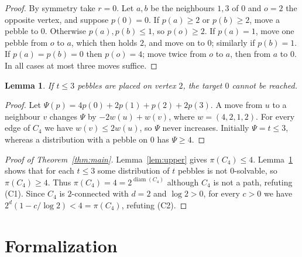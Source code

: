 \documentclass[11pt]{article}
\theoremstyle{plain}
\newtheorem{lemma}[theorem]{Lemma}
\theoremstyle{definition}
\theoremstyle{remark}
\newcommand{\diam}{\operatorname{diam}}
\begin{document}
\begin{proof}
By symmetry take $r=0$. Let $a,b$ be the neighbours $1,3$ of $0$ and $o=2$ the
opposite vertex, and suppose $p(0)=0$. If $p(a)\ge2$ or $p(b)\ge2$, move a pebble to
$0$. Otherwise $p(a),p(b)\le1$, so $p(o)\ge2$. If $p(a)=1$, move one pebble from $o$
to $a$, which then holds $2$, and move on to $0$; similarly if $p(b)=1$. If
$p(a)=p(b)=0$ then $p(o)=4$; move twice from $o$ to $a$, then from $a$ to $0$. In all
cases at most three moves suffice.
\end{proof}

\begin{lemma}\label{lem:lower}
If $t\le3$ pebbles are placed on vertex $2$, the target $0$ cannot be reached.
\end{lemma}

\begin{proof}
Let $\Psi(p)=4p(0)+2p(1)+p(2)+2p(3)$. A move from $u$ to a neighbour $v$ changes
$\Psi$ by $-2w(u)+w(v)$, where $w=(4,2,1,2)$. For every edge of $C_4$ we have
$w(v)\le2w(u)$, so $\Psi$ never increases. Initially $\Psi=t\le3$, whereas a
distribution with a pebble on $0$ has $\Psi\ge4$.
\end{proof}

\begin{proof}[Proof of Theorem~\ref{thm:main}]
Lemma~\ref{lem:upper} gives $\pi(C_4)\le4$. Lemma~\ref{lem:lower} shows that for each
$t\le3$ some distribution of $t$ pebbles is not $0$-solvable, so $\pi(C_4)\ge4$. Thus
$\pi(C_4)=4=2^{\diam(C_4)}$ although $C_4$ is not a path, refuting (C1). Since $C_4$
is $2$-connected with $d=2$ and $\log2>0$, for every $c>0$ we have
$2^d(1-c/\log 2)<4=\pi(C_4)$, refuting (C2).
\end{proof}

\section{Formalization}
\end{document}
